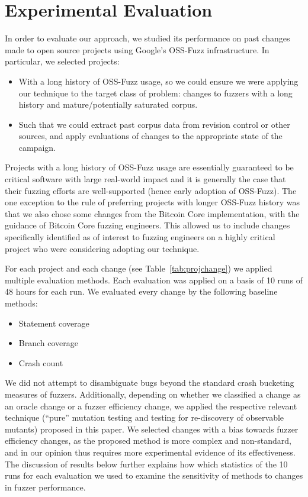 \section{Experimental Evaluation}

In order to evaluate our approach, we studied its performance on past
changes made to open source projects using Google's OSS-Fuzz
infrastructure.  In particular, we selected projects:

\begin{itemize}
\item With a long history of OSS-Fuzz usage, so we could ensure we
  were applying our technique to the target class of problem: changes
  to fuzzers with a long history and mature/potentially saturated
  corpus.
  \item Such that we could extract past corpus data from revision
    control or other sources, and apply evaluations of changes to the
    appropriate state of the campaign.
  \end{itemize}

Projects with a long history of OSS-Fuzz usage are essentially
guaranteed to be critical software with large real-world impact and
it is generally the case that their fuzzing efforts are well-supported
(hence early adoption of OSS-Fuzz).  The one exception to the rule of
preferring projects with longer OSS-Fuzz history was that we also
chose some changes from the Bitcoin Core implementation, with the
guidance of Bitcoin Core fuzzing engineers.  This allowed us to
include changes specifically identified as of interest to fuzzing
engineers on a highly critical project who were considering adopting
our technique.

For each project and each change (see Table~\ref{tab:projchange}) we
applied multiple evaluation methods.  Each evaluation was applied on a
basis of 10 runs of 48 hours for each run.  We evaluated every change
by the following baseline methods:

\begin{itemize}
\item Statement coverage
\item Branch coverage
\item Crash count
\end{itemize}

We did not attempt to disambiguate bugs beyond the standard crash
bucketing measures of fuzzers.  Additionally, depending on whether we
classified a change as an oracle change or a fuzzer efficiency change,
we applied the respective relevant technique (``pure'' mutation testing and
testing for re-discovery of observable mutants) proposed in this
paper.   We selected changes with a bias towards fuzzer efficiency
changes, as the proposed method is more complex and non-standard, and
in our opinion thus requires more experimental evidence of its
effectiveness.  The discussion of results below further explains how
which statistics of the 10 runs for each evaluation we used to examine
the sensitivity of methods to changes in fuzzer performance.

